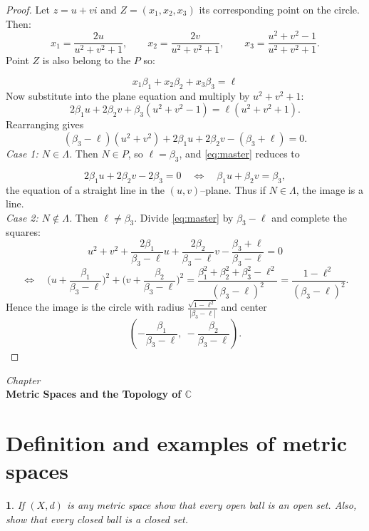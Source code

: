 \documentclass[12pt, a4paper]{report}
\newcommand{\chapter}[1]{%
  \par\vspace{2em}%
  \refstepcounter{section}%
  \begin{center}
    \textit{Chapter \thesection} \\[1.5ex]
    \textbf{#1}
  \end{center}
  \vspace{1em}%
}
\theoremstyle{spaced}
\newtheorem{exercise}{}
\newcommand{\setexercise}[1]{\setcounter{exercise}{#1-1}}
\begin{document}
\begin{proof}
	Let \(z=u+vi\) and \(Z=(x_1, x_2, x_3)\) its corresponding point on the circle. Then:
	\[
		x_1=\frac{2u}{u^2+v^2+1},\qquad
		x_2=\frac{2v}{u^2+v^2+1},\qquad
		x_3=\frac{u^2+v^2-1}{u^2+v^2+1}.
	\]
	Point \(Z\) is also belong to the \(P\) so:

	\[
		x_1 \beta_1 + x_2 \beta_2 + x_3 \beta_3 = \ell
	\]
	Now substitute into the plane equation and multiply by $u^2+v^2+1$:
	\[
		2\beta_1u+2\beta_2v+\beta_3(u^2+v^2-1)=\ell(u^2+v^2+1).
	\]
	Rearranging gives
	\begin{equation}\label{eq:master}
		(\beta_3-\ell)(u^2+v^2)+2\beta_1u+2\beta_2v-(\beta_3+\ell)=0.
	\end{equation}
	\emph{Case 1: $N\in\Lambda$.}
	Then $N\in P$, so $\ell=\beta_3$, and \eqref{eq:master} reduces to

	\[
		2\beta_1u+2\beta_2v-2\beta_3=0
		\quad\Longleftrightarrow\quad
		\beta_1u+\beta_2v=\beta_3,
	\]
	the equation of a straight line in the $(u,v)$–plane. Thus if $N\in\Lambda$, the image is a line.\\

	\noindent	\emph{Case 2: $N\notin\Lambda$.}
	Then $\ell\neq\beta_3$. Divide \eqref{eq:master} by $\beta_3-\ell$ and complete the squares:
	\[
		u^2+v^2+\frac{2\beta_1}{\beta_3-\ell}u+\frac{2\beta_2}{\beta_3-\ell}v
		-\frac{\beta_3+\ell}{\beta_3-\ell}=0
	\]
	\[
		\Longleftrightarrow\quad
		\Big(u+\frac{\beta_1}{\beta_3-\ell}\Big)^2+\Big(v+\frac{\beta_2}{\beta_3-\ell}\Big)^2
		=\frac{\beta_1^2+\beta_2^2+\beta_3^2-\ell^2}{(\beta_3-\ell)^2}
		=\frac{1-\ell^2}{(\beta_3-\ell)^2}.
	\]
	Hence the image is the circle with radius \(		\frac{\sqrt{1-\ell^2}}{|\beta_3-\ell|}\) and center
	\[
		\left(-\frac{\beta_1}{\beta_3-\ell},\ -\frac{\beta_2}{\beta_3-\ell}\right).
	\]
\end{proof}

\newpage
\chapter{Metric Spaces and the Topology of $\mathbb{C}$}
\section{Definition and examples of metric spaces}

\setexercise{3}
\begin{exercise}
	If $(X,d)$ is any metric space show that every open ball is an open set.
	Also, show that every closed ball is a closed set.
\end{exercise}
\end{document}

